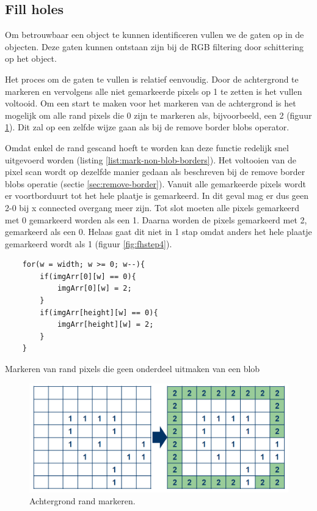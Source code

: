 \subsection{Fill holes}

Om betrouwbaar een object te kunnen identificeren vullen we de gaten op in de
objecten. Deze gaten kunnen ontstaan zijn bij de RGB filtering door schittering
op het object.

Het proces om de gaten te vullen is relatief eenvoudig. Door de achtergrond te
markeren en vervolgens alle niet gemarkeerde pixels op 1 te zetten is het vullen
voltooid. Om een start te maken voor het markeren van de achtergrond is het
mogelijk om alle rand pixels die 0 zijn te markeren als, bijvoorbeeld, een 2
(figuur \ref{fig:fhstep1}). Dit zal op een zelfde wijze gaan als bij de remove
border blobs operator.

Omdat enkel de rand gescand hoeft te worden kan deze functie redelijk snel
uitgevoerd worden (listing \ref{list:mark-non-blob-borders}). Het voltooien van
de pixel scan wordt op dezelfde manier gedaan als beschreven bij de remove
border blobs operatie (sectie \ref{sec:remove-border}). Vanuit alle gemarkeerde
pixels wordt er voortborduurt tot het hele plaatje is gemarkeerd. In dit geval
mag er dus geen 2-0 bij x connected overgang meer zijn. Tot slot moeten alle
pixels gemarkeerd met 0 gemarkeerd worden als een 1. Daarna worden de pixels
gemarkeerd met 2, gemarkeerd als een 0. Helaas gaat dit niet in 1 stap omdat
anders het hele plaatje gemarkeerd wordt als 1 (figuur \ref{fig:fhstep4}).

\begin{listing}
    \begin{verbatim}
    for(w = width; w >= 0; w--){
        if(imgArr[0][w] == 0){
            imgArr[0][w] = 2;
        }
        if(imgArr[height][w] == 0){
            imgArr[height][w] = 2;
        }
    }
    \end{verbatim}
    \caption{Markeren van rand pixels die geen onderdeel uitmaken van een blob}
    \label{list:mark-non-blob-borders}
\end{listing}

\begin{figure}
    \begin{center}
        \includegraphics[scale=0.35]{figures/fill_holes_step1.png}
    \end{center}
    \caption{Achtergrond rand markeren.}
    \label{fig:fhstep1}
\end{figure}

